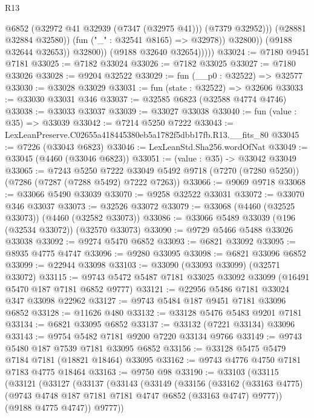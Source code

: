 \begin{lexlean}{R13}
\begin{coremodule}
                              @6852
                              (@32972 @41 @32939 (@7347 (@32975 @41)))
                              (@7379 @32952)))
                          (@28881 @32884 @32580))
                        (fun ("_" : @32541 @8165) => @32978))
                      @32800))
                  (@9188 @32644 @32653))
                @32800))
            (@9188 @32640 @32654)))))
@33024 := @7180 @9451 @7181
@33025 := @7182 @33024
@33026 := @7182 @33025
@33027 := @7180 @33026
@33028 := @9204 @32522
@33029 := fun (__p0 : @32522) => @32577
@33030 := @33028 @33029
@33031 := fun (state : @32522) => @32606
@33033 := @33030 @33031 @346
@33037 := @32585 @6823 (@32588 @4774 @4746)
@33038 := @33033 @33037
@33039 := @33027 @33038
@33040 := fun (value : @35) => @33039
@33042 := @7214 @5250 @7222
@33043 := LexLeanPreserve.C02655a418445380eb5a1782f5dbb17fb.R13.__fits_80
@33045 := @7226 (@33043 @6823)
@33046 := LexLeanStd.Sha256.wordOfNat
@33049 := @33045 (@4460 (@33046 @6823))
@33051 := (value : @35) -> @33042 @33049
@33065 := @7243
    @5250
    @7222
    @33049
    @5492
    @9718
    (@7270 (@7280 @5250))
    (@7286 (@7287 (@7288 @5492) @7222 @7263))
@33066 := @9069 @9718
@33068 := @33066 @5490 @33039
@33070 := @9258 @32522 @33031
@33072 := @33070 @346 @33037
@33073 := @32526 @33072
@33079 := @33068 (@4460 (@32525 @33073)) (@4460 (@32582 @33073))
@33086 := @33066 @5489 @33039 (@196 (@32534 @33072)) (@32570 @33073)
@33090 := @9729 @5466 @5488 @33026 @33038
@33092 := @9274 @5470 @6852
@33093 := @6821 @33092
@33095 := @8935 @4775 @4747
@33096 := @9280 @33095
@33098 := @6821 @33096 @6852
@33099 := @22944 @33098
@33103 := @33090 (@33093 @33099) (@32571 @33072)
@33115 := @9743 @5472 @5487 @7181 @33025 @33092 @33099 (@16491 @5470 @187 @7181 @6852 @9777)
@33121 := @22956 @5486 @7181 @33024 @347 @33098 @22962
@33127 := @9743 @5484 @187 @9451 @7181 @33096 @6852
@33128 := @11626 @480
@33132 := @33128 @5476 @5483 @9201 @7181
@33134 := @6821 @33095 @6852
@33137 := @33132 (@7221 @33134) @33096
@33143 := @9754 @5482 @7181 @9200 @7220 @33134 @9766
@33149 := @9743 @5480 @187 @7539 @7181 @33095 @6852
@33156 := @33128 @5475 @5479 @7184 @7181 (@18821 @18464) @33095
@33162 := @9743 @4776 @4750 @7181 @7183 @4775 @18464
@33163 := @9750 @98
@33190 := @33103
    (@33115
      (@33121
        (@33127
          (@33137
            (@33143
              (@33149
                (@33156
                  (@33162
                    (@33163 @4775)
                    (@9743 @4748 @187 @7181 @7181 @4747 @6852 (@33163 @4747) @9777))
                  (@9188 @4775 @4747))
                @9777))

\end{coremodule}
\end{lexlean}
